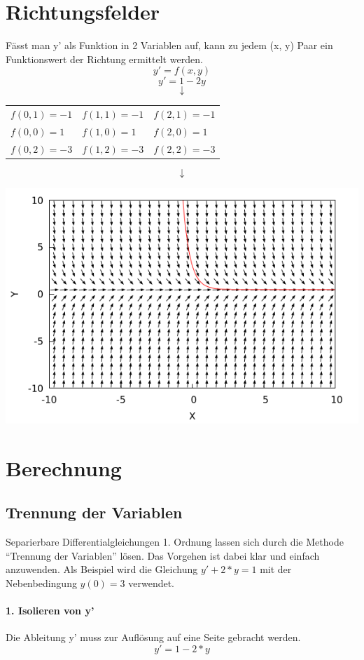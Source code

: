 \documentclass[a4paper,12pt]{article}
\begin{document}
\section{Richtungsfelder}
F\"asst man y' als Funktion in 2 Variablen auf, kann zu jedem (x, y) Paar ein Funktionswert der Richtung ermittelt werden.
$$y' = f(x, y)$$
$$y' = 1 - 2y$$
$$\downarrow$$
\begin{tabular}{l l l}
 $f(0, 1) = -1$ & $f(1, 1) = -1$ & $f(2, 1) = -1$\\
 $f(0, 0) = 1$ & $f(1, 0) = 1$ & $f(2, 0) = 1$\\
 $f(0, 2) = -3$ & $f(1, 2) = -3$ & $f(2, 2) = -3$
\end{tabular}

$$\downarrow$$

\includegraphics[scale=0.6]{richtungsfeld01.png}

\newpage

\section{Berechnung}
\subsection{Trennung der Variablen}
Separierbare Differentialgleichungen 1. Ordnung lassen sich durch die Methode ``Trennung der Variablen'' l\"osen.
Das Vorgehen ist dabei klar und einfach anzuwenden. Als Beispiel wird die Gleichung $y' + 2*y = 1$ mit der Nebenbedingung $y(0) = 3$ verwendet.
\paragraph{1. Isolieren von y'}
Die Ableitung y' muss zur Aufl\"osung auf eine Seite gebracht werden.
$$y' = 1 - 2*y$$
\end{document}
